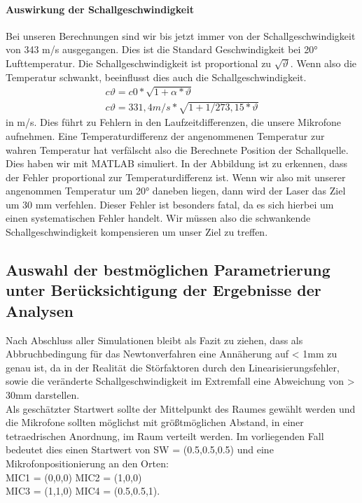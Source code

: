 \paragraph{Auswirkung der Schallgeschwindigkeit}
Bei unseren Berechnungen sind wir bis jetzt immer von der Schallgeschwindigkeit von 343 m/s ausgegangen. Dies ist die Standard Geschwindigkeit bei 20° Lufttemperatur. Die Schallgeschwindigkeit ist proportional zu $\sqrt{\vartheta}$. Wenn also die Temperatur schwankt, beeinflusst dies auch die Schallgeschwindigkeit. 
\begin{align}
c\vartheta = c0 * \sqrt{1+\alpha * \vartheta}\\   
c\vartheta =  331,4 m/s * \sqrt{1 + 1/273,15 * \vartheta}
\end{align}
 in m/s. Dies führt zu Fehlern in den Laufzeitdifferenzen, die unsere Mikrofone aufnehmen. Eine Temperaturdifferenz der angenommenen Temperatur zur wahren Temperatur hat verfälscht also die Berechnete Position der Schallquelle. Dies haben wir mit MATLAB simuliert. In der Abbildung ist zu erkennen, dass der Fehler proportional zur Temperaturdifferenz ist. Wenn wir also mit unserer angenommen Temperatur um 20° daneben liegen, dann wird der Laser das Ziel um 30 mm verfehlen. Dieser Fehler ist besonders fatal, da es sich hierbei um einen systematischen Fehler handelt. Wir müssen also die schwankende Schallgeschwindigkeit kompensieren um unser Ziel zu treffen.
\subsection{Auswahl der bestmöglichen Parametrierung unter Berücksichtigung der Ergebnisse der Analysen}
Nach Abschluss aller Simulationen bleibt als Fazit zu ziehen, dass als Abbruchbedingung für das Newtonverfahren eine Annäherung auf < 1mm zu genau ist, da in der Realität die Störfaktoren durch den Linearisierungsfehler, sowie die veränderte Schallgeschwindigkeit im Extremfall eine Abweichung von > 30mm darstellen.\\
Als geschätzter Startwert sollte der Mittelpunkt des Raumes gewählt werden und die Mikrofone sollten möglichst mit größtmöglichen Abstand, in einer tetraedrischen Anordnung, im Raum verteilt werden. Im vorliegenden Fall bedeutet dies einen Startwert von SW = (0.5,0.5,0.5) und eine Mikrofonpositionierung an den Orten: \\
MIC1 = (0,0,0)
MIC2 = (1,0,0)\\
MIC3 = (1,1,0)
MIC4 = (0.5,0.5,1).